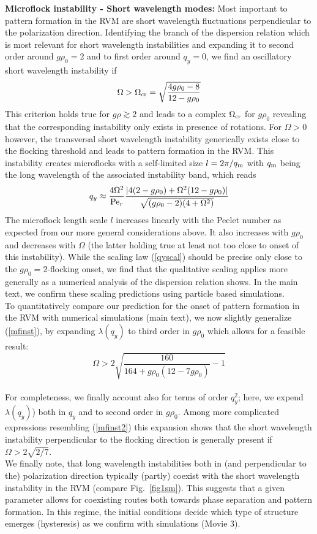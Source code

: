 \documentclass[aps,twocolumn,showlabels,showrefs,amsmath,amssymb,pre,superscriptaddress, floatfix, colors]{revtex4}
\newcommand{\1}{\begin{equation}}
\newcommand{\2}{\end{equation}}
\newcommand{\4}[2]{{\frac{#1}{#2}}}
\begin{document}
\vspace{0.5cm}
\textbf{Microflock instability - Short wavelength modes:}
Most important to pattern formation in the RVM are short wavelength fluctuations perpendicular 
to the polarization direction. Identifying the branch of the dispersion relation which is most 
relevant for short wavelength instabilities and expanding it to second order around $g\rho_0=2$ 
and to first order around $q_y=0$, we find an oscillatory short 
wavelength instability if
\1 \Omega > \Omega_{\rm cr}=\sqrt{\4{4g \rho_0-8}{12-g\rho_0}} \label{mfinst}\2
This criterion holds true for $g\rho \gtrsim 2$ and leads to a complex $\Omega_{\rm cr}$ for $g\rho_0$ revealing 
that the corresponding instability only exists in presence of rotations.
For $\Omega>0$ however, the transversal short wavelength instability generically exists close to the flocking 
threshold and leads to pattern formation in the RVM. 
This instability creates microflocks with a self-limited size $l=2\pi/q_{\rm m}$ with 
$q_{\rm m}$ being the long wavelength of the associated instability band, which reads
\1 
q_y \approx \4{4\Omega^2}{{\rm Pe}_r} \4{|4(2-g\rho_0)+\Omega^2(12-g\rho_0)|}{\sqrt{(g\rho_0-2)(4+\Omega^2)}} \label{qyscal}
\2
The microflock length scale $l$ increases 
linearly with the Peclet number as expected from our more general considerations above. 
It also increases with $g\rho_0$ and decreases with $\Omega$ (the latter holding true at least not too close to onset of this instability). 
While the scaling law (\ref{qyscal}) should be precise only close to the 
$g\rho_0=2$-flocking onset, we find that the qualitative scaling applies more generally as a numerical analysis of the dispersion relation shows. 
In the main text, we confirm these scaling predictions using particle based simulations. 
\\To quantitatively compare our prediction for the onset of pattern formation in the RVM
with numerical simulations (main text), we now slightly generalize
(\ref{mfinst}), by expanding $\lambda(q_y)$ to third order in $g\rho_0$ which allows for a feasible result:
\1 \Omega > 2 \sqrt{\4{160}{164+g\rho_0(12-7g\rho_0)}-1} \label{mfinst2} \2
\\For completeness, we finally account also for terms of order $q_y^2$; here, we expend $\lambda(q_y)$) both in $q_y$ and to second order in $g\rho_0$. Among more complicated expressions 
resembling (\ref{mfinst2}) 
this expansion shows that the short wavelength instability perpendicular to the flocking direction is generally present if $\Omega > 2\sqrt{2/7}$.
\\We finally note, that long wavelength instabilities both in (and perpendicular to the) polarization direction 
typically (partly) coexist with the short wavelength instability in the RVM (compare Fig.~\ref{fig1sm}).  
This suggests that a given parameter allows for coexisting routes both towards phase separation and pattern formation. In this regime, the initial conditions decide which type of structure emerges (hysteresis) as we confirm 
with simulations (Movie 3). 
\end{document}
